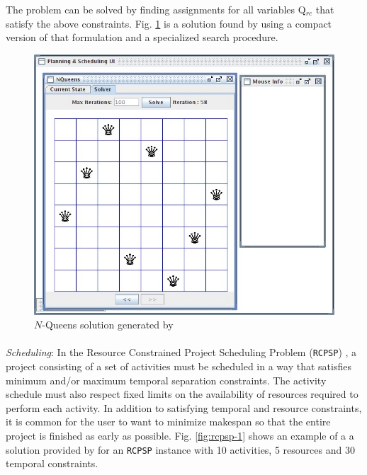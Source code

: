 {The problem can be solved by finding assignments for all variables
Q$_{rc}$ that satisfy the above constraints. Fig. \ref{fig:nqueens-2}
is a solution found by \eu using a compact version of that formulation
and a specialized search procedure.

\begin{figure}
\centering
\includegraphics[scale=0.35]{figs/Example-NQueens1.jpg}
\caption{\small $N$-Queens solution generated by \eu}
\label{fig:nqueens-2}
\end{figure}


\paragraph{} \textit{Scheduling}: In the Resource Constrained Project
Scheduling Problem (\texttt{RCPSP}) \cite{Bruckera99}, a project
consisting of a set of activities must be scheduled in a way that
satisfies minimum and/or maximum temporal separation constraints. The
activity schedule must also respect fixed limits on the availability
of resources required to perform each activity. In addition to
satisfying temporal and resource constraints, it is common for the
user to want to minimize makespan \cite{ghallab04} so that the entire
project is finished as early as possible. Fig. \ref{fig:rcpsp-1} shows
an example of a a solution provided by \eu for an \texttt{RCPSP}
instance with 10 activities, 5 resources and 30 temporal constraints.

}
